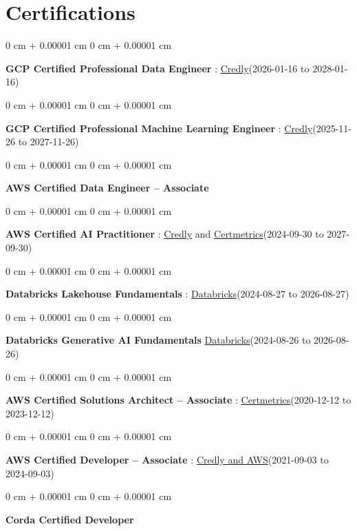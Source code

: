 \documentclass[10pt, letterpaper]{article}
\newenvironment{onecolentry}{
    \begin{adjustwidth}{
        0 cm + 0.00001 cm
    }{
        0 cm + 0.00001 cm
    }
}{
    \end{adjustwidth}
} %
\begin{document}
    \vspace{2 pt }
    \section{Certifications}
        \vspace{2 pt }
        \begin{samepage}
            \begin{onecolentry}
                \textbf{GCP Certified Professional Data Engineer} : \href{https://www.credly.com/badges/977e96d9-12e7-4f6c-b8a7-df71fb7153b8/public_url}{Credly}(2026-01-16 to 2028-01-16)
            \end{onecolentry}
            \begin{onecolentry}
                \textbf{GCP Certified Professional Machine Learning Engineer} : \href{https://www.credly.com/badges/a6965347-09ea-4d8f-b398-0e151407160d/public_url}{Credly}(2025-11-26 to 2027-11-26)
            \end{onecolentry}
            \begin{onecolentry}
                \textbf{AWS Certified Data Engineer – Associate}
            \end{onecolentry}
            \begin{onecolentry}
                \textbf{AWS Certified AI Practitioner} : \href{https://www.credly.com/badges/451b7ba5-8be1-4a8e-bbec-ade26627a6b6/public_url}{Credly} and \href{https://cp.certmetrics.com/amazon/en/public/verify/credential/495f0d9853874bf9a33c17f8e89ce131}{Certmetrics}(2024-09-30 to 2027-09-30)
            \end{onecolentry}
            \begin{onecolentry}
                \textbf{Databricks Lakehouse Fundamentals} : \href{https://scl.io/FXGKS0u}{Databricks}(2024-08-27 to 2026-08-27)
            \end{onecolentry}
            \begin{onecolentry}
                \textbf{Databricks Generative AI Fundamentals} \href{https://sgq.io/3uIFGNi}{Databricks}(2024-08-26 to 2026-08-26)
            \end{onecolentry}
            \begin{onecolentry}
                \textbf{AWS Certified Solutions Architect – Associate} : \href{https://cp.certmetrics.com/amazon/en/public/verify/credential/SNBY48EBJJVE1SWX}{Certmetrics}(2020-12-12 to 2023-12-12)
            \end{onecolentry}
            \begin{onecolentry}
                \textbf{AWS Certified Developer – Associate} : \href{https://www.credly.com/badges/b8106fbd-d3d1-4204-8cdf-e708798fd582/public_url}{Credly and AWS}(2021-09-03  to 2024-09-03)
            \end{onecolentry}
            \begin{onecolentry}
                \textbf{Corda Certified Developer}
            \end{onecolentry}
        \end{samepage}
\end{document}
